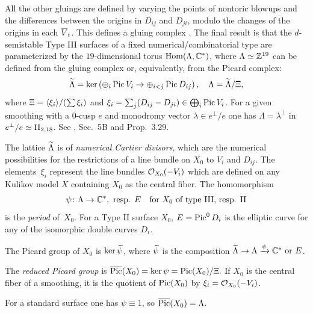 \documentclass{amsart}
\begin{document}
All the other gluings are defined by varying the points of
nontoric blowups and the differences between the origins in $D_{ij}$
and $D_{ji}$, modulo the changes of the origins in each ${\overline V}_i$.  This
defines a gluing complex \cite[Def.~5.10]{alexeev2021compact}. The
final result is that the $d$-semistable Type III surfaces of a fixed
numerical/combinatorial type are parameterized by the $19$-dimensional torus
$\operatorname{Hom}(\Lambda, {\mathbb C}^*)$, where $\Lambda\simeq{\mathbb Z}^{19}$ can be defined
from the gluing complex or, equivalently, from the Picard complex:
\begin{equation}\label{eq:picard-complex}
  \widetilde\Lambda = \ker \left(\oplus_i\operatorname{Pic} V_i \to \oplus_{i<j} \operatorname{Pic} D_{ij}\right),
  \quad \Lambda = \widetilde\Lambda/\Xi, 
\end{equation}
where $\Xi = \langle \xi_i \rangle / (\sum \xi_i)$ 
and $\xi_i = \sum_j (D_{ij}-D_{ji}) \in \bigoplus_i \operatorname{Pic} V_i$.  For a
given smoothing with a $0$-cusp $e$ and monodromy vector
$\lambda\in e^\perp/e$ one has $\Lambda = \lambda^\perp$ in
$e^\perp/e \simeq {\rm II}_{2,18}$. See \cite{alexeev2021compact}, Sec.~5B
and Prop.~3.29.

The lattice $\widetilde\Lambda$ is of \emph{numerical Cartier
  divisors}, which are the numerical possibilities for the
restrictions of a line bundle on $X_0$ to $V_i$ and $D_{ij}$. The
elements~$\xi_i$ represent the line bundles ${\mathcal O}_{X_0}(-V_i)$ which
are defined on any Kulikov model $X$ containing $X_0$ as the central
fiber.  The homomorphism
\begin{equation}\label{eq:period}
  \psi\colon\Lambda\to{\mathbb C}^*, \ \text{resp. } E
  \quad\text{for } X_0 \text{ of type III, resp. II}
\end{equation}
is the \emph{period} of~$X_0$.  For a Type II surface $X_0$,
$E=\operatorname{Pic}^0 D_i$ is the elliptic curve for any of the isomorphic
double curves $D_i$.

The Picard group of $X_0$ is $\ker\widetilde\psi$,
where $\widetilde\psi$ is the composition
$\widetilde\Lambda \to \Lambda \xrightarrow{\psi}{\mathbb C}^*\textrm{ or }E$.

\begin{definition}\label{def:reduced-picard}
  The \emph{reduced Picard group} is
  \begin{math}
    \overline{\operatorname{Pic}} (X_0) = \ker\psi = \operatorname{Pic}(X_0) / \Xi.
  \end{math}
  If $X_0$ is the central fiber of a smoothing, it is the quotient of
  $\operatorname{Pic}(X_0)$ by $\xi_i={\mathcal O}_{X_0}(-V_i)$.
\end{definition}
For a standard surface one has $\psi\equiv 1$, so $\overline{\operatorname{Pic}}(X_0) =
\Lambda$.
\end{document}
